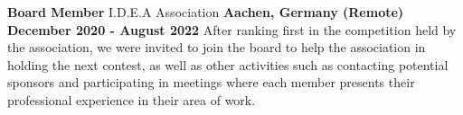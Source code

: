 

\begin{cventries}

  \cventry
    {\textbf{Board Member}} %
    {I.D.E.A Association} %
    {\textbf{Aachen, Germany (Remote)}} %
    {\textbf{December 2020 - August 2022}} %
    {
      After ranking first in the competition held by the association, we were invited to join the board to help the association in holding the next contest, as well as other activities such as contacting potential sponsors and participating in meetings where each member presents their professional experience in their area of work.
    }

\end{cventries}
